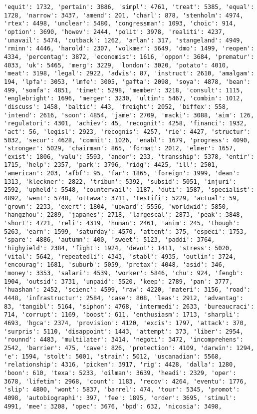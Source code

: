\documentclass[11pt]{article}
\begin{document}
\begin{Verbatim}[commandchars=\\\{\}]
'equit': 1732, 'pertain': 3886, 'simpl': 4761, 'treat': 5385, 'equal': 1728, 'narrow': 3437, 'amend': 201, 'charl': 878, 'stenholm': 4974, 'rtex': 4498, 'unclear': 5480, 'congressman': 1093, 'choic': 914, 'option': 3690, 'howev': 2444, 'polit': 3978, 'realiti': 4237, 'unavail': 5474, 'cutback': 1262, 'arlan': 317, 'stangeland': 4949, 'rminn': 4446, 'harold': 2307, 'volkmer': 5649, 'dmo': 1499, 'reopen': 4334, 'percentag': 3872, 'economist': 1616, 'oppon': 3684, 'prematur': 4033, 'uk': 5465, 'merg': 3229, 'london': 3020, 'potato': 4010, 'meat': 3198, 'legal': 2922, 'advis': 87, 'instruct': 2610, 'amalgam': 194, 'lpfa': 3053, 'lmfe': 3005, 'gafta': 2098, 'soya': 4878, 'bean': 499, 'somfa': 4851, 'timet': 5298, 'member': 3218, 'consult': 1115, 'englebright': 1696, 'merger': 3230, 'ultim': 5467, 'combin': 1012, 'discuss': 1458, 'baltic': 443, 'freight': 2052, 'biffex': 558, 'intend': 2616, 'soon': 4854, 'jame': 2709, 'macki': 3088, 'aim': 126, 'regulatori': 4301, 'achiev': 45, 'recognit': 4258, 'financi': 1932, 'act': 56, 'legisl': 2923, 'recognis': 4257, 'rie': 4427, 'structur': 5032, 'secur': 4628, 'commit': 1026, 'enabl': 1679, 'progress': 4090, 'stronger': 5029, 'chairman': 865, 'format': 2012, 'elmer': 1657, 'exist': 1806, 'valu': 5593, 'andor': 233, 'transship': 5378, 'entir': 1715, 'help': 2357, 'park': 3796, 'ridg': 4425, 'ill': 2501, 'american': 203, 'afbf': 95, 'far': 1865, 'foreign': 1999, 'dean': 1313, 'kleckner': 2822, 'tribun': 5392, 'subsid': 5051, 'injuri': 2592, 'upheld': 5548, 'countervail': 1187, 'duti': 1587, 'specialist': 4892, 'went': 5748, 'ottawa': 3711, 'testifi': 5229, 'actual': 59, 'grown': 2233, 'exert': 1804, 'upward': 5556, 'worldwid': 5850, 'hangzhou': 2289, 'japanes': 2718, 'largescal': 2873, 'peak': 3848, 'short': 4721, 'reli': 4319, 'human': 2461, 'anim': 245, 'though': 5263, 'earn': 1599, 'saturday': 4570, 'attent': 375, 'especi': 1753, 'spare': 4886, 'autumn': 400, 'sweet': 5123, 'paddi': 3764, 'highyield': 2384, 'fight': 1924, 'devot': 1411, 'stress': 5020, 'vital': 5642, 'repeatedli': 4343, 'stabl': 4935, 'outlin': 3724, 'encourag': 1681, 'suburb': 5059, 'pretax': 4048, 'asid': 346, 'money': 3353, 'salari': 4539, 'worker': 5846, 'chu': 924, 'fengb': 1904, 'outsid': 3731, 'unpaid': 5520, 'keep': 2789, 'pan': 3777, 'huashan': 2452, 'scienc': 4599, 'raw': 4220, 'materi': 3156, 'road': 4448, 'infrastructur': 2584, 'case': 808, 'leas': 2912, 'advantag': 83, 'tangibl': 5164, 'siphon': 4768, 'intermedi': 2633, 'bureaucraci': 714, 'corrupt': 1169, 'boost': 611, 'enthusiasm': 1713, 'sharpli': 4693, 'hgca': 2374, 'provision': 4120, 'excis': 1797, 'attack': 370, 'surpris': 5110, 'disappoint': 1443, 'attempt': 373, 'liber': 2954, 'rounnd': 4483, 'multilater': 3414, 'negoti': 3472, 'incomprehens': 2542, 'barrier': 475, 'cave': 826, 'protection': 4109, 'darwin': 1294, 'e': 1594, 'stolt': 5001, 'strain': 5012, 'uscanadian': 5568, 'relationship': 4316, 'picken': 3917, 'rig': 4428, 'dalla': 1280, 'boon': 610, 'texa': 5233, 'oilman': 3639, 'headi': 2329, 'oper': 3678, 'lifetim': 2968, 'count': 1183, 'recov': 4264, 'eventu': 1776, 'slip': 4800, 'wont': 5837, 'barrel': 474, 'tour': 5345, 'promot': 4098, 'autobiographi': 397, 'fee': 1895, 'order': 3695, 'stimul': 4991, 'mee': 3208, 'opec': 3676, 'bpd': 632, 'nicosia': 3498, 
\end{Verbatim}
\end{document}
